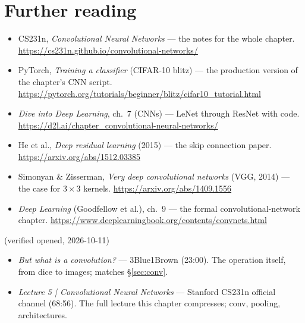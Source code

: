 \section*{Further reading}
\begin{itemize}
\item CS231n, \emph{Convolutional Neural Networks} --- the notes for
the whole chapter.
\url{https://cs231n.github.io/convolutional-networks/}
\item PyTorch, \emph{Training a classifier} (CIFAR-10 blitz) --- the
production version of the chapter's CNN script.
\url{https://pytorch.org/tutorials/beginner/blitz/cifar10_tutorial.html}
\item \emph{Dive into Deep Learning}, ch.\ 7 (CNNs) --- LeNet through
ResNet with code.
\url{https://d2l.ai/chapter_convolutional-neural-networks/}
\item He et al., \emph{Deep residual learning} (2015) --- the skip
connection paper.
\url{https://arxiv.org/abs/1512.03385}
\item Simonyan \& Zisserman, \emph{Very deep convolutional networks}
(VGG, 2014) --- the case for $3\times3$ kernels.
\url{https://arxiv.org/abs/1409.1556}
\item \emph{Deep Learning} (Goodfellow et al.), ch.\ 9 --- the formal
convolutional-network chapter.
\url{https://www.deeplearningbook.org/contents/convnets.html}
\end{itemize}

\begin{rulebox}
(verified opened, 2026-10-11)
\begin{itemize}
\item \emph{But what is a convolution?} --- 3Blue1Brown (23:00). The
operation itself, from dice to images; matches \S\ref{sec:conv}.
\item \emph{Lecture 5 | Convolutional Neural Networks} --- Stanford
CS231n official channel (68:56). The full lecture this chapter
compresses; conv, pooling, architectures.
\end{itemize}
\end{rulebox}

